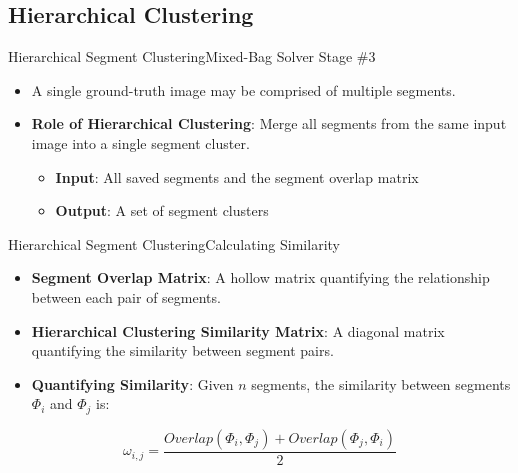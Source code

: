 \documentclass[10pt]{beamer}
\begin{document}
\subsection{Hierarchical Clustering}
\begin{frame}{Hierarchical Segment Clustering}{Mixed-Bag Solver Stage \#3}
  \begin{itemize}
    \item A single ground-truth image may be comprised of multiple segments.
    \vfill
    \item \textbf{Role of Hierarchical Clustering}: Merge all segments from the same input image into a single segment cluster.
    \begin{itemize}
      \vspace{0.4em}
      \item \textbf{Input}: All saved segments and the segment overlap matrix
  		\vspace{0.6em}
      \item \textbf{Output}: A set of segment clusters
    \end{itemize}
  \end{itemize}
\end{frame}


\begin{frame}{Hierarchical Segment Clustering}{Calculating Similarity}
  \begin{itemize}
    \item \textbf{Segment Overlap Matrix}: A hollow matrix quantifying the relationship between each pair of segments.
    \vspace{1em}
    \item \textbf{Hierarchical Clustering Similarity Matrix}: A diagonal matrix quantifying the similarity between segment pairs.
    \vspace{1em}
    \item \textbf{Quantifying Similarity}: Given $n$ segments, the similarity between segments $\Phi_i$ and $\Phi_j$ is:
  \end{itemize}
  \vspace{-1.5em}
  \begin{center}
    \begin{equation}
      \omega_{i,j} = \frac{Overlap(\Phi_i, \Phi_j) + Overlap(\Phi_j, \Phi_i)}{2} 
    \end{equation}
  \end{center}  
\end{frame}
\end{document}
